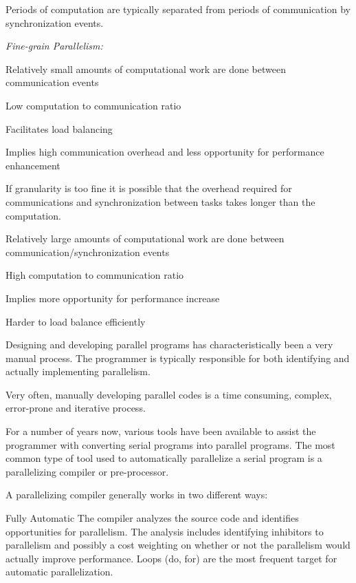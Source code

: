           Periods of computation are typically separated from periods of communication by synchronization events.

      \emph{Fine-grain Parallelism:}

          Relatively small amounts of computational work are done between communication events

          Low computation to communication ratio

          Facilitates load balancing

          Implies high communication overhead and less opportunity for performance enhancement

          If granularity is too fine it is possible that the overhead required for communications and synchronization between tasks takes longer than the computation.


          Relatively large amounts of computational work are done between communication/synchronization events

          High computation to communication ratio

          Implies more opportunity for performance increase

          Harder to load balance efficiently

    Designing and developing parallel programs has characteristically been a very manual process. The programmer is typically responsible for both identifying and actually implementing parallelism.

Very often, manually developing parallel codes is a time consuming, complex, error-prone and iterative process.

For a number of years now, various tools have been available to assist the programmer with converting serial programs into parallel programs. The most common type of tool used to automatically parallelize a serial program is a parallelizing compiler or pre-processor.

A parallelizing compiler generally works in two different ways:

    Fully Automatic
        The compiler analyzes the source code and identifies opportunities for parallelism.
        The analysis includes identifying inhibitors to parallelism and possibly a cost weighting on whether or not the parallelism would actually improve performance.
        Loops (do, for) are the most frequent target for automatic parallelization.

